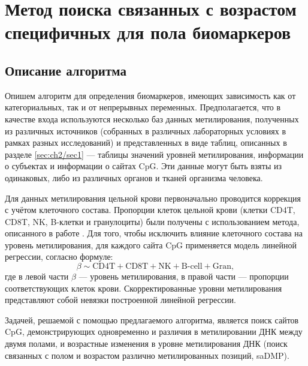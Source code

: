 \section{Метод поиска связанных с возрастом специфичных для пола биомаркеров}\label{sec:ch2/sec2}

\subsection{Описание алгоритма}\label{subsec:ch2/sec2/subsec1}

Опишем алгоритм для определения биомаркеров, имеющих зависимость как от категориальных, так и от непрерывных переменных. Предполагается, что в качестве входа используются несколько баз данных метилирования, полученных из различных источников (собранных в различных лабораторных условиях в рамках разных исследований) и представленных в виде таблиц, описанных в разделе \ref{sec:ch2/sec1} --- таблицы значений уровней метилирования, информации о субъектах и информации о сайтах CpG. Эти данные могут быть взяты из одинаковых, либо из различных органов и тканей организма человека. 

Для данных метилирования цельной крови первоначально проводится коррекция с учётом клеточного состава. Пропорции клеток цельной крови (клетки CD4T, CD8T, NK, B-клетки и гранулоциты) были получены с использованием метода, описанного в работе \autocite{Horvath2013}. Для того, чтобы исключить влияние клеточного состава на уровень метилирования, для каждого сайта CpG применяется модель линейной регрессии, согласно формуле:
\begin{equation}
\label{eq:cell_correction}
\beta \sim \text{CD4T} + \text{CD8T} + \text{NK} + \text{B-cell} + \text{Gran},
\end{equation}
где в левой части $\beta$ --- уровень метилирования, в правой части --- пропорции соответствующих клеток крови. Скорректированные уровни метилирования представляют собой невязки построенной линейной регрессии.

Задачей, решаемой с помощью предлагаемого алгоритма, является поиск сайтов CpG, демонстрирующих одновременно и различия в метилировании ДНК между двумя полами, и возрастные изменения в уровне метилирования ДНК (поиск связанных с полом и возрастом различно метилированных позиций, saDMP). 

